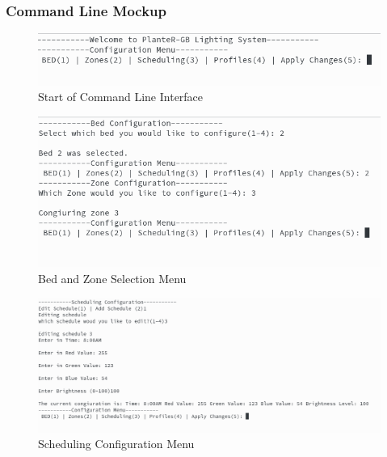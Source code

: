 			            \subsubsection{Command Line Mockup}
			            \begin{center}
			                \begin{figure}[H]
			                    \includegraphics[width=\linewidth]{comand_line_interface/Selection_006.png}
			                    \caption{Start of Command Line Interface}
			                    \label{fig:Start of Command Line Interface}
			                \end{figure}

			                \begin{figure}[H]
			                    \includegraphics[width=\linewidth]{comand_line_interface/Selection_003.png}
			                    \caption{Bed and Zone Selection Menu}
			                    \label{fig:Bed and Zone Selection Menu}
			                \end{figure}

			            \begin{figure}[H]
			                \includegraphics[width=\linewidth]{comand_line_interface/Selection_004.png}
			                \caption{Scheduling Configuration Menu}
			                \label{fig:Scheduling Configuration Menu}
			            \end{figure}


\end{center}
